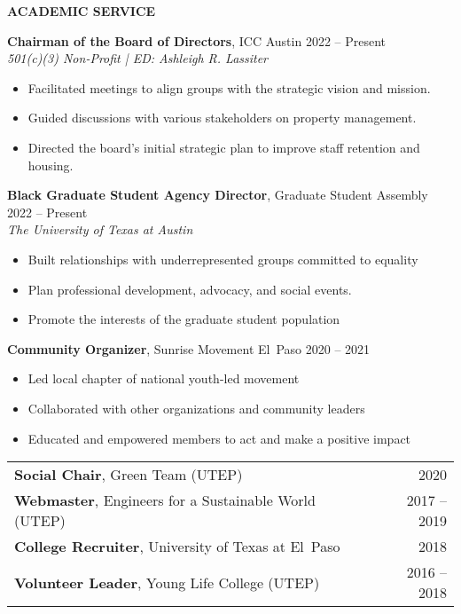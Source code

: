 \documentclass[11pt]{article}
\newcommand{\sectionheading}[1]{%
    \vspace{1.6ex}%
    {\large\bfseries\MakeUppercase{#1}}\par\vspace{0.8ex}%
  }
\newcommand{\sectionheading}[1]{%
    \vspace{1.6ex}%
    {\large\bfseries{\HeadingFace \MakeUppercase{#1}}}\par\vspace{0.8ex}%
  }
\begin{document}
\sectionheading{Academic Service}

\textbf{Chairman of the Board of Directors}, ICC Austin \hfill 2022 -- Present\\
\textit{501(c)(3) Non-Profit \;|\; ED: Ashleigh R. Lassiter}
\begin{itemize}
  \item Facilitated meetings to align groups with the strategic vision and mission.
  \item Guided discussions with various stakeholders on property management.
  \item Directed the board’s initial strategic plan to improve staff retention and housing.
\end{itemize}

\textbf{Black Graduate Student Agency Director}, Graduate Student Assembly \hfill 2022 -- Present\\
\textit{The University of Texas at Austin}
\begin{itemize}
  \item Built relationships with underrepresented groups committed to equality
  \item Plan professional development, advocacy, and social events.
  \item Promote the interests of the graduate student population
\end{itemize}

\textbf{Community Organizer}, Sunrise Movement El Paso \hfill 2020 -- 2021
\begin{itemize}
  \item Led local chapter of national youth-led movement
  \item Collaborated with other organizations and community leaders
  \item Educated and empowered members to act and make a positive impact
\end{itemize}

\begin{tabular*}{\textwidth}{@{\extracolsep{\fill}}p{}r}
  \textbf{Social Chair}, Green Team (UTEP) & 2020\\[0.4ex]
  \textbf{Webmaster}, Engineers for a Sustainable World (UTEP) & 2017 -- 2019\\[0.4ex]
  \textbf{College Recruiter}, University of Texas at El Paso & 2018\\[0.4ex]
  \textbf{Volunteer Leader}, Young Life College (UTEP) & 2016 -- 2018\\
\end{tabular*}
\end{document}
